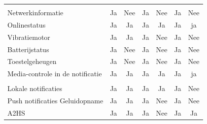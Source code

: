 \begin{table}[]
\begin{tabular}{p{6cm}cccccc}
			 &  & &  &  &  &  \\
			 
			  Netwerkinformatie & \cellcolor{green!40} Ja  &  \cellcolor{red!50} Nee & \cellcolor{green!40} Ja  & \cellcolor{red!50} Nee & \cellcolor{green!40} Ja &  \cellcolor{red!50} Nee \\
			  
			  Onlinestatus & \cellcolor{green!40} Ja  & \cellcolor{green!40} Ja & \cellcolor{green!40} Ja  & \cellcolor{green!40} Ja & \cellcolor{green!40} Ja & \cellcolor{green!40} ja \\
			  
			  Vibratiemotor & \cellcolor{green!40} Ja  & \cellcolor{green!40} Ja & \cellcolor{green!40} Ja & \cellcolor{red!50} Nee  & \cellcolor{green!40} Ja & \cellcolor{red!50} Nee \\
			  
			  Batterijstatus & \cellcolor{green!40} Ja  &  \cellcolor{red!50} Nee & \cellcolor{green!40} Ja  & \cellcolor{red!50} Nee & \cellcolor{green!40} Ja &  \cellcolor{red!50} Nee \\
			  
			  Toestelgeheugen & \cellcolor{green!40} Ja  &  \cellcolor{red!50} Nee & \cellcolor{green!40} Ja  & \cellcolor{red!50} Nee & \cellcolor{green!40} Ja &  \cellcolor{red!50} Nee \\
			  
			  Media-controle in de notificatie & \cellcolor{green!40} Ja  & \cellcolor{green!40} Ja & \cellcolor{green!40} Ja  & \cellcolor{green!40} Ja & \cellcolor{green!40} Ja & \cellcolor{green!40} ja \\
			  
			   &  & &  &  &  &  \\
			   
			   Lokale notificaties & \cellcolor{green!40} Ja  & \cellcolor{green!40} Ja & \cellcolor{green!40} Ja  & \cellcolor{green!40} Ja & \cellcolor{green!40} Ja &  \cellcolor{red!50} Nee \\
			   
			   Push notificaties  Geluidopname & \cellcolor{green!40} Ja  & \cellcolor{green!40} Ja & \cellcolor{green!40} Ja & \cellcolor{red!50} Nee  & \cellcolor{green!40} Ja & \cellcolor{red!50} Nee \\
			   
			   A2HS & \cellcolor{green!40} Ja  & \cellcolor{green!40} Ja & \cellcolor{green!40} Ja & \cellcolor{red!50} Nee  & \cellcolor{green!40} Ja & \cellcolor{green!40} Ja \\
			   

\end{tabular}
\end{table}
